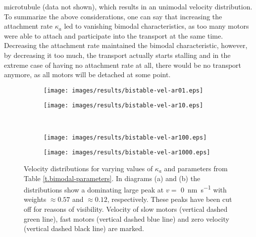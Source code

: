 microtubule (data not shown), which results in an unimodal velocity distribution. \\
To summarize the above considerations, one can say that increasing the attachment rate $\kappa_a$ led to vanishing bimodal characteristics, as too many motors were able to attach and participate
into the transport at the same time. Decreasing the attachment rate maintained the bimodal characteristic, however, by decreasing it too much, the transport actually starts stalling and in the
extreme case of having no attachment rate at all, there would be no transport anymore, as all motors will be detached at some point.

\begin{figure}
\centering
\begin{subfigure}{0.3\textwidth}
 \texttt{[image: images/results/bistable-vel-ar01.eps]}
\end{subfigure}
\begin{subfigure}{0.3\textwidth}
 \texttt{[image: images/results/bistable-vel-ar10.eps]}
\end{subfigure}\\
\begin{subfigure}{0.3\textwidth}
 \texttt{[image: images/results/bistable-vel-ar100.eps]}
\end{subfigure}
\begin{subfigure}{0.3\textwidth}
 \texttt{[image: images/results/bistable-vel-ar1000.eps]}
\end{subfigure}
\caption[Influence of attachment rate $\kappa_a$ on bimodal velocity distribution]{Velocity distributions for varying values of $\kappa_a$ and parameters from Table \ref{t.bimodal-parameters}. In diagrams (a) and (b) the distributions show a dominating large peak at $v =$ \SI[per-mode=fraction]{0}{\nano\metre\per\second} with weights $\approx 0.57$ and $\approx 0.12$, respectively. These peaks have been cut off for reasons of visibility. Velocity of slow motors (vertical dashed green line), fast motors (vertical dashed blue line) and zero velocity (vertical dashed black line) are marked.} 
\label{img.bimodal-ar-comparison}
\end{figure}


